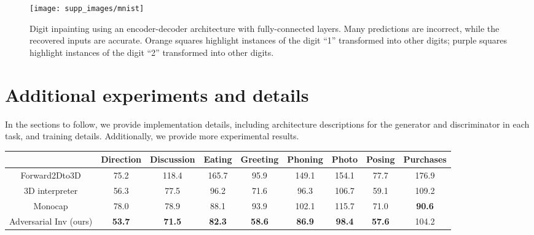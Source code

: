 \documentclass[10pt,twocolumn,letterpaper]{article}
\begin{document}
\begin{bibunit}[ieee]
\begin{appendices}
\begin{figure}[t]
    \centering
    \texttt{[image: supp\_images/mnist]}
     \centering
    \caption{Digit inpainting using an encoder-decoder architecture with fully-connected layers. Many predictions are incorrect, while the recovered inputs are accurate. Orange squares highlight instances of the digit ``1'' transformed into other digits; purple squares highlight instances of the digit ``2'' transformed into other digits.}
    \label{fig:mnist}
\end{figure}\section{Additional experiments and details}
In the sections to follow,  we provide implementation details, including architecture descriptions for the generator and discriminator in each task, and training details. Additionally, we provide more experimental results.



\begin{table*}
\centering
\begin{tabular}{ c c c c c c c c c}
 \hline
  & Direction & Discussion & Eating & Greeting & Phoning & Photo & Posing & Purchases\\
 \hline
  Forward2Dto3D & 75.2 & 118.4 & 165.7 & 95.9 & 149.1 & 154.1 & 77.7 & 176.9 \\
  3D interpreter \cite{Wu2016} & 56.3 & 77.5 & 96.2 & 71.6 & 96.3 & 106.7 & 59.1 & 109.2 \\
  Monocap \cite{DBLP:journals/corr/ZhouZPLDD17}&  78.0 & 78.9 & 88.1 & 93.9 & 102.1 & 115.7 & 71.0 & {\bf 90.6} \\
  Adversarial Inv (ours) & {\bf 53.7} & {\bf 71.5} & {\bf 82.3} & {\bf 58.6} & {\bf 86.9} & {\bf 98.4} & {\bf 57.6} &  104.2 \\
  

\end{tabular}
\end{table*}
\end{appendices}
\end{bibunit}
\end{document}
